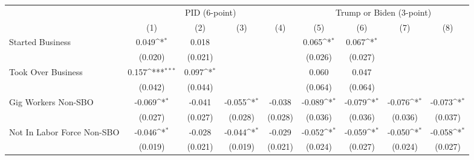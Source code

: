 {
\def\sym#1{\ifmmode^{#1}\else\(^{#1}\)\fi}
\begin{tabular}{l*{8}{c}}
\hline\hline
                    &\multicolumn{4}{c}{PID (6-point)}                                                      &\multicolumn{4}{c}{Trump or Biden (3-point)}                                           \\
                    &\multicolumn{1}{c}{(1)}         &\multicolumn{1}{c}{(2)}         &\multicolumn{1}{c}{(3)}         &\multicolumn{1}{c}{(4)}         &\multicolumn{1}{c}{(5)}         &\multicolumn{1}{c}{(6)}         &\multicolumn{1}{c}{(7)}         &\multicolumn{1}{c}{(8)}         \\
\hline
Started Business    &       0.049\sym{*}  &       0.018         &                     &                     &       0.065\sym{*}  &       0.067\sym{*}  &                     &                     \\
                    &     (0.020)         &     (0.021)         &                     &                     &     (0.026)         &     (0.027)         &                     &                     \\
Took Over Business  &       0.157\sym{***}&       0.097\sym{*}  &                     &                     &       0.060         &       0.047         &                     &                     \\
                    &     (0.042)         &     (0.044)         &                     &                     &     (0.064)         &     (0.064)         &                     &                     \\
Gig Workers Non-SBO &      -0.069\sym{*}  &      -0.041         &      -0.055\sym{*}  &      -0.038         &      -0.089\sym{*}  &      -0.079\sym{*}  &      -0.076\sym{*}  &      -0.073\sym{*}  \\
                    &     (0.027)         &     (0.027)         &     (0.028)         &     (0.028)         &     (0.036)         &     (0.036)         &     (0.036)         &     (0.037)         \\
Not In Labor Force Non-SBO&      -0.046\sym{*}  &      -0.028         &      -0.044\sym{*}  &      -0.029         &      -0.052\sym{*}  &      -0.059\sym{*}  &      -0.050\sym{*}  &      -0.058\sym{*}  \\
                    &     (0.019)         &     (0.021)         &     (0.019)         &     (0.021)         &     (0.024)         &     (0.027)         &     (0.024)         &     (0.027)         \\

\end{tabular}}
